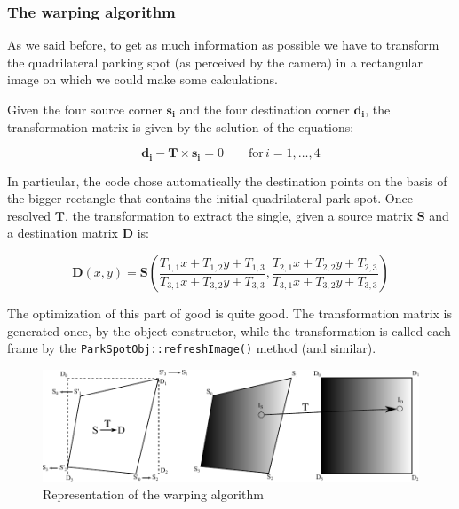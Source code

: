 		\subsubsection{The warping algorithm \label{sub:warping}}
		
		As we said before, to get as much information as possible we have to transform
		the quadrilateral parking spot (as perceived by the camera) in a rectangular
		image on which we could make some calculations.
		
		Given the four source corner $\mathbf{s_i}$ and the four destination corner
		$\mathbf{d_i}$, the transformation matrix is given by the solution of the
		equations:
		
		\begin{equation}
			\mathbf{d_i} - \mathbf{T}\times\mathbf{s_i} = 0 \qquad
			\mathrm{for}\,i=1,\ldots,4
		\end{equation}
		
		In particular, the code chose automatically the destination points on the
		basis of the bigger rectangle that contains the initial quadrilateral park
		spot. Once resolved $\mathbf{T}$, the transformation to extract the single,
		given a source matrix $\mathbf{S}$ and a destination matrix $\mathbf{D}$ is:
		
		\begin{equation}
			\mathbf{D}(x,y) = \mathbf{S}\left(
			\dfrac{T_{1,1}x+T_{1,2}y+T_{1,3}}{T_{3,1}x+T_{3,2}y+T_{3,3}},
			\dfrac{T_{2,1}x+T_{2,2}y+T_{2,3}}{T_{3,1}x+T_{3,2}y+T_{3,3}} \right)
		\end{equation}
		
		The optimization of this part of good is quite good. The transformation matrix
		is generated once, by the object constructor, while the transformation is
		called each frame by the \verb+ParkSpotObj::refreshImage()+ method (and
		similar).
		
		\begin{figure}[H] \label{fig:warping}
			\centering
				\includegraphics[keepaspectratio, scale=0.6]{img/warping.pdf}
			\caption{Representation of the warping algorithm}
		\end{figure}